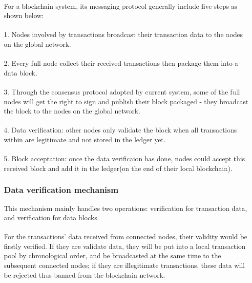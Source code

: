 \documentclass[doublespacing]{bmcart}
\begin{document}
\begin{CJK*}{UTF8}{gbsn}
\paragraph{} For a blockchain system, its messaging protocol generally include five steps as shown below:
\paragraph{} 1. Nodes involved by transactions broadcast their transaction data to the nodes on the global network.
\paragraph{} 2. Every full node collect their received transactions then package them into a data block.
\paragraph{} 3. Through the consensus protocol adopted by current system, some of the full nodes will get the right to sign and publish their block packaged - they broadcast the block to the nodes on the global network.
\paragraph{} 4. Data verification: other nodes only validate the block when all transactions within are legitimate and not stored in the ledger yet.
\paragraph{} 5. Block acceptation: once the data verificaion has done, nodes could accept this received block and add it in the ledger(on the end of their local blockchain).
\subsubsection*{Data verification mechanism}
This mechanism mainly handles two operations: verification for transaction data, and verification for data blocks.
\paragraph{} For the transactions' data received from connected nodes, their validity would be firstly verified. If they are validate data, they will be put into a local transaction pool by chronological order, and be broadcasted at the same time to the subsequent connected nodes; if they are illegitimate transactions, these data will be rejected thus banned from the blockchain network.

\end{CJK*}
\end{document}
